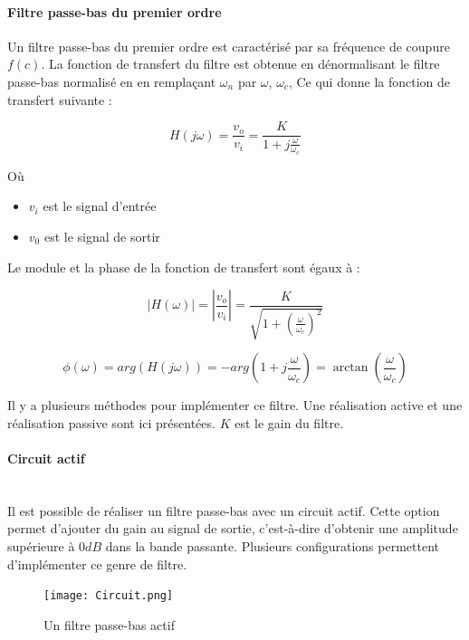 \documentclass[conference,onecolumn]{IEEEtran}
\begin{document}
\paragraph{Filtre passe-bas du premier ordre}
Un filtre passe-bas du premier ordre est caractérisé par sa fréquence de coupure $f(c)$.  La fonction de transfert du filtre est obtenue en dénormalisant le filtre passe-bas normalisé en en remplaçant $\omega_n$ par $\omega$, $\omega_c$,
Ce qui donne la fonction de transfert suivante :

\begin{equation}
    H(j\omega)= \frac{v_o}{v_i} = \frac{K}{1+j\frac{\omega}{\omega_c}}
\end{equation}

Où
\begin{itemize}
    \item[] $v_i$ est le signal d'entrée
    \item[] $v_0$ est le signal de sortir
\end{itemize}


Le module et la phase de la fonction de transfert sont égaux à :

\begin{equation}
    |H(\omega)|=|\frac{v_o}{v_i}|= \frac{K}{\sqrt{1 + (\frac{\omega}{\omega_c})^2}}
\end{equation}

\begin{equation}
    \phi(\omega) = arg(H(j\omega)) = -arg(1 + j\frac{\omega}{\omega_c}) = \arctan(\frac{\omega}{\omega_c})
\end{equation}

Il y a plusieurs méthodes pour implémenter ce filtre. Une réalisation active et une réalisation passive sont ici présentées. $K$ est le gain du filtre.

\paragraph{Circuit actif}
\hfill\\
Il est  possible de réaliser un filtre passe-bas avec un circuit actif. Cette option permet d'ajouter du gain au signal de sortie, c'est-à-dire d'obtenir une amplitude supérieure à $0dB$ dans la bande passante. Plusieurs configurations permettent d'implémenter ce genre de filtre.

 \begin{figure}[H]
 \centering
    \texttt{[image: Circuit.png]}
    \caption{Un filtre passe-bas actif}
\end{figure}
\end{document}
